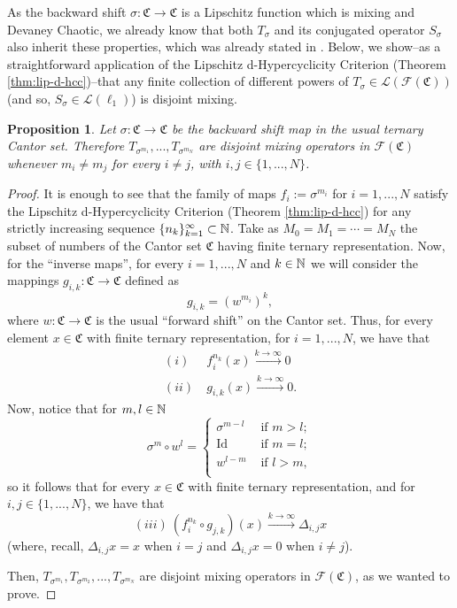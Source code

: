 \documentclass[11pt,reqno]{article}
\newtheorem{proposition}[statement]{Proposition}
\def\cantor{\mathfrak{C}}
\def\id{\text{Id}}
\newcommand{\free}[1]{\mathcal{F}(#1)} %
\def\NN{\Bbb N}
\begin{document}
    As the backward shift $\sigma:\cantor \to \cantor$ is a Lipschitz function which is mixing and Devaney Chaotic, we already know that both $T_\sigma$ and its conjugated operator $S_\sigma$ also inherit these properties, which was already stated in \cite{ACP2021}. Below, we show--as a straightforward application of the Lipschitz d-Hypercyclicity Criterion (Theorem \ref{thm:lip-d-hcc})--that any finite collection of different powers of $T_\sigma\in \mathcal{L}(\free{\cantor}) $ (and so, $S_\sigma \in \mathcal{L}(\ell_1)$) is disjoint mixing.






\begin{proposition} \label{prop:backward-cantor}
    Let $\sigma: \cantor \to \cantor$ be the backward shift map in the usual ternary Cantor set. Therefore $T_{\sigma^{m_1}},...,T_{\sigma^{m_N}}$ are disjoint mixing operators in $\free{\cantor}$ whenever $m_i \neq m_j$ for every $i\neq j$, with $i,j\in \{1,...,N\}$.
\end{proposition} 

\begin{proof}
    It is enough to see that the family of maps $f_i:= \sigma^{m_i}$ for $i=1,...,N$ satisfy the Lipschitz d-Hypercyclicity Criterion (Theorem \ref{thm:lip-d-hcc}) for any strictly increasing sequence $\{n_{k}\}_{k=1}^\infty \subset \NN$. Take as $M_0=M_1= \cdots = M_N$ the subset of numbers of the Cantor set $\cantor$ having finite ternary representation. Now, for the ``inverse maps'', for every $i=1,...,N$ and $k\in \NN$ we will consider the mappings $g_{i,k}\colon \cantor \to \cantor$ defined as
    \[g_{i,k}= (w^{m_i})^k,\]
    where $w:\cantor \to \cantor$ is the usual ``forward shift'' on the Cantor set. Thus, for every element $x\in \cantor$ with finite ternary representation, for $i=1,...,N$, we have that 
  \begin{align*}
  (i)& \   f_i^{n_k}(x) \xrightarrow{k\to \infty} 0\\
  (ii)&\ g_{i,k}(x)\xrightarrow{k\to \infty}  0.
  \end{align*}
  Now, notice that for $m,l\in \NN$
  \begin{equation*}
    \sigma^m\circ w^l= 
      \begin{cases}
        \sigma^{m-l} & \text{ if } m>l;\\
      \id & \text{ if } m=l;\\
      w^{l-m} & \text{ if } l>m,\\
      \end{cases}
  \end{equation*}
 so it follows that for every $x\in \cantor$ with finite ternary representation, and for $i,j\in \{1,...,N\}$, we have that
  \[ (iii) \ (f_{i}^{n_k} \circ g_{j,k}) (x) \xrightarrow{k\to \infty } \Delta_{i,j} x\]
  (where, recall, $\Delta_{i,j} x= x$ when $i=j$ and $\Delta_{i,j}x=0$ when $i\neq j$).

  Then, $T_{\sigma^{m_1}},T_{\sigma^{m_2}},...,T_{\sigma^{m_N}}$ are disjoint mixing operators in $\free{\cantor}$, as we wanted to prove.
\end{proof}
\end{document}
